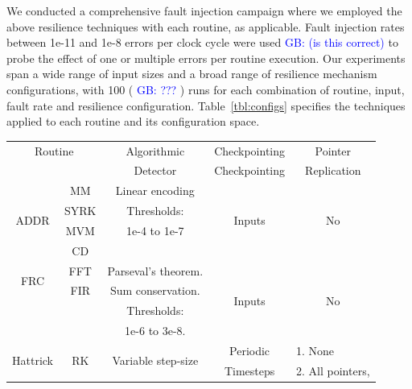 \documentclass[10pt, conference, compsocconf]{IEEEtran}
\newcommand{\greg}[1]{%
  \textcolor{blue}{GB: #1}
}
\begin{document}
We conducted a comprehensive fault injection campaign where we employed the above resilience techniques with each routine, as applicable.
Fault injection rates between 1e-11 and 1e-8 errors per clock cycle were used\greg{(is this correct)} to probe the effect of one or multiple errors per routine execution.
Our experiments span a wide range of input sizes and a broad range of resilience mechanism configurations, with 100 (\greg{???}) runs for each combination of routine, input, fault rate and resilience configuration.
Table~\ref{tbl:configs} specifies the techniques applied to each routine and its configuration space.
\begin{table}
  \begin{tabular}{|c|c|c|c|c|}
    \hline
    \multicolumn{2}{|c|}{Routine}          & Algorithmic                    & Checkpointing           & Pointer \\
    \multicolumn{2}{|c|}{}                 & Detector                       & Checkpointing           & Replication  \\
    \hline
    \multirow{4}{*}{ADDR}      & MM   & Linear encoding                     & \multirow{4}{*}{Inputs} & \multirow{4}{*}{No} \\
                               & SYRK & Thresholds:                         &                         &  \\
                               & MVM  & 1e-4 to 1e-7                        &                         &  \\
                               & CD   &                                     &                         &  \\
    \hline
    \multirow{2}{*}{FRC}       & FFT  & Parseval's theorem.                 & \multirow{4}{*}{Inputs} & \multirow{4}{*}{No} \\
                               & FIR  & Sum conservation.                   &                         &   \\
                               &      & Thresholds:                         &                         &   \\
                               &      & 1e-6 to 3e-8.                       &                         &   \\
    \hline
    \multirow{5}{*}{Hattrick}  & \multirow{5}{*}{RK} & \multirow{5}{*}{Variable step-size} & Periodic & \multicolumn{1}{|l|}{1. None}  \\
                               &      &                                   & Timesteps      & \multicolumn{1}{|l|}{2. All pointers,} \\

\end{tabular}
\end{table}
\end{document}
